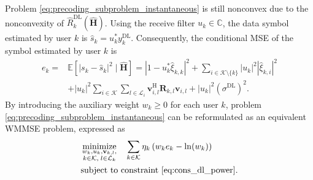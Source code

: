 \documentclass[10pt, conference]{IEEEtran}
\DeclareMathOperator*{\minimize}{minimize}
\begin{document}
Problem \eqref{eq:precoding_subproblem_instantaneous} is still nonconvex due to the nonconvexity of $\hat{R}_k^{\mathrm{DL}}\left(\hat{\mathbf{H}}\right)$. Using the receive filter $u_k \in \mathbb{C}$, the data symbol estimated by user $k$ is $\hat{s}_k = u_k^* y_k^\textrm{DL}$. Consequently, the conditional MSE of the symbol estimated by user $k$ is
\begin{align}
e_k \!=\!{}&\mathbb{E}\!\left[
\left| s_k - \hat{s}_k \right|^2 \mid \hat{\mathbf{H}}
\right]
\!=\!\left|1 - u_k^*\hat{\xi}_{k,k}\right|^2 \!+\! \sum\limits_{i\in\mathcal{K}\setminus\{k\}} \left|u_k\right|^2\left|\hat{\xi}_{k,i}\right|^2 \nonumber \\
&+ \left|u_k\right|^2 \sum\limits_{i \in \mathcal{K}} \sum\limits_{l\in \mathcal{L}_i}
\mathbf{v}_{i,l}^\mathrm{H} \mathbf{R}_{k,l} \mathbf{v}_{i,l}
+ \left|u_k\right|^2 \left(\sigma^{\mathrm{DL}}\right)^2.
\end{align}
By introducing the auxiliary weight $w_k \geq 0$ for each user $k$, problem \eqref{eq:precoding_subproblem_instantaneous} can be reformulated as an equivalent WMMSE problem, expressed as
\begin{align}
&\minimize_{\substack{
w_k, u_k, \mathbf{v}_{k,l},\\
k \in \mathcal{K},\; l \in \mathcal{L}_k
}} \quad\sum_{k \in \mathcal{K}} \eta_{k}\left(w_k e_k - \ln  (w_k)\right) \label{eq:WMMSE_problem}\\
&\textrm{subject to constraint \eqref{eq:cons_dl_power}}. \notag
\end{align} 
\end{document}
